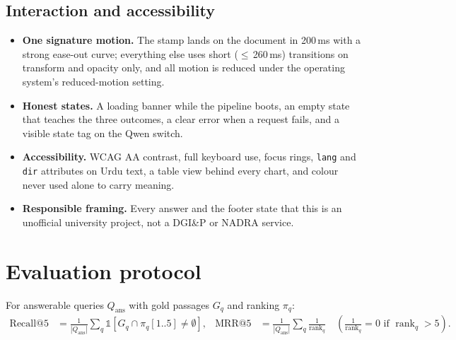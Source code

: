\documentclass[11pt,a4paper]{article}
\begin{document}
\subsection{Interaction and accessibility}
\begin{itemize}
  \item \textbf{One signature motion.} The stamp lands on the document in 200\,ms with a strong ease-out curve; everything else
        uses short (\(\leq\)\,260\,ms) transitions on transform and opacity only, and all motion is reduced under the
        operating system's reduced-motion setting.
  \item \textbf{Honest states.} A loading banner while the pipeline boots, an empty state that teaches the three outcomes, a
        clear error when a request fails, and a visible state tag on the Qwen switch.
  \item \textbf{Accessibility.} WCAG AA contrast, full keyboard use, focus rings, \texttt{lang} and \texttt{dir} attributes on
        Urdu text, a table view behind every chart, and colour never used alone to carry meaning.
  \item \textbf{Responsible framing.} Every answer and the footer state that this is an unofficial university project, not a
        DGI\&P or NADRA service.
\end{itemize}

\section{Evaluation protocol}
\label{sec:protocol}

For answerable queries $Q_{\text{ans}}$ with gold passages $G_q$ and ranking $\pi_q$:
\begin{align}
\text{Recall@5} &= \frac{1}{|Q_{\text{ans}}|}\sum_{q} \mathbb{1}\!\left[G_q \cap \pi_q[1..5] \neq \emptyset\right], &
\text{MRR@5} &= \frac{1}{|Q_{\text{ans}}|}\sum_{q} \frac{1}{\operatorname{rank}_q}\quad\left(\tfrac{1}{\operatorname{rank}_q}=0 \text{ if } \operatorname{rank}_q>5\right).
\end{align}
\end{document}
